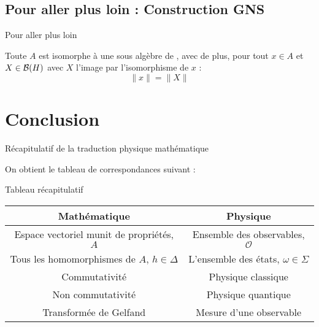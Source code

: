 \documentclass[11pt, xcolor=table]{beamer}
\begin{document}
\subsection{Pour aller plus loin : Construction GNS}

\begin{frame}{Pour aller plus loin}

    \begin{myth}
        Toute \Calg $A$ est isomorphe à une sous algèbre de \Bh, avec de plus, pour tout $x \in A$ et $X \in \mathcal{B}(H)$ avec $X$ l'image
        par l'isomorphisme de $x$ :
        \[
            \| x \| = \| X \|
        \]
    \end{myth}
\end{frame}





\section{Conclusion}

\begin{frame}{Récapitulatif de la traduction physique mathématique}

    On obtient le tableau de correspondances suivant :
    \renewcommand{\arraystretch}{1.5}
    \setlength{\tabcolsep}{0.2cm}
    \begin{block}{Tableau récapitulatif}
        \begin{tabular}{|c|c|}
            \hline
            \textbf{Mathématique} & \textbf{Physique} \\
            \hline
            Espace vectoriel munit de propriétés, $A$ & Ensemble des observables, $\mathcal{O}$\\
            \hline
            Tous les homomorphismes de $A$, $ h \in \Delta$ & L'ensemble des états, $\omega \in \Sigma$ \\
            \hline
            Commutativité & Physique classique\\
            \hline 
            Non commutativité & Physique quantique \\
            \hline
            Transformée de Gelfand & Mesure d'une observable \\
            \hline
        \end{tabular}
    \end{block}
\end{frame} 


\nocite{*}

\begin{frame}

    
\end{frame}
\end{document}
